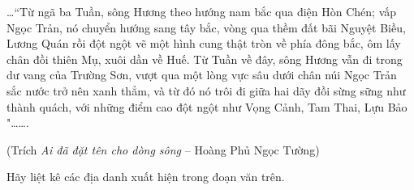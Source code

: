\begin{vd}
	\ldots ``Từ ngã ba Tuần, sông Hương theo hướng nam bắc qua điện Hòn Chén; vấp Ngọc Trản, nó chuyển hướng sang tây bắc, vòng qua thềm đất bãi Nguyệt Biều, Lương Quán rồi đột ngột vẽ một hình cung thật tròn về phía đông bắc, ôm lấy chân đồi thiên Mụ, xuôi dần về Huế. Từ Tuần về đây, sông Hương vẫn đi trong dư vang của Trường Sơn, vượt qua một lòng vực sâu dưới chân núi Ngọc Trản sắc nước trở nên xanh thẳm, và từ đó nó trôi đi giữa hai dãy đồi sừng sững như thành quách, với những điểm cao đột ngột như Vọng Cảnh, Tam Thai, Lựu Bảo "\ldots\ldots.
	
	\hfill (Trích \textit{Ai đã đặt tên cho dòng sông} -- Hoàng Phủ Ngọc Tường)
	
	Hãy liệt kê các địa danh xuất hiện trong đoạn văn trên.
\end{vd}
